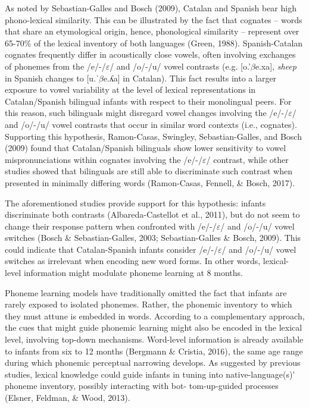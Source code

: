 \documentclass[man,floatsintext]{apa6}
\begin{document}
As noted by Sebastian-Galles and Bosch (2009), Catalan and Spanish bear high phono-lexical similarity. This can be illustrated by the fact that cognates -- words that share an etymological origin, hence, phonological similarity -- represent over 65-70\% of the lexical inventory of both languages (Green, 1988). Spanish-Catalan cognates frequently differ in acoustically close vowels, often involving exchanges of phonemes from the /e/-/\(\varepsilon\)/ and /o/-/u/ vowel contrasts (e.g. {[}o.'\(\beta\)e.xa{]}, \emph{sheep} in Spanish changes to {[}u.ˈ\(\beta\)e.ʎa{]} in Catalan). This fact results into a larger exposure to vowel variability at the level of lexical representations in Catalan/Spanish bilingual infants with respect to their monolingual peers. For this reason, such bilinguals might disregard vowel changes involving the /e/-/\(\varepsilon\)/ and /o/-/u/ vowel contrasts that occur in similar word contexts (i.e., cognates). Supporting this hypothesis, Ramon-Casas, Swingley, Sebastian-Galles, and Bosch (2009) found that Catalan/Spanish bilinguals show lower sensitivity to vowel mispronunciations within cognates involving the /e/-/\(\varepsilon\)/ contrast, while other studies showed that bilinguals are still able to discriminate such contrast when presented in minimally differing words (Ramon-Casas, Fennell, \& Bosch, 2017).

The aforementioned studies provide support for this hypothesis: infants discriminate both contrasts (Albareda-Castellot et al., 2011), but do not seem to change their response pattern when confronted with /e/-/\(\varepsilon\)/ and /o/-/u/ vowel switches (Bosch \& Sebastian-Galles, 2003; Sebastian-Galles \& Bosch, 2009). This could indicate that Catalan-Spanish infants consider /e/-/\(\varepsilon\)/ and /o/-/u/ vowel switches as irrelevant when encoding new word forms. In other words, lexical-level information might modulate phoneme learning at 8 months.

Phoneme learning models have traditionally omitted the fact that infants are rarely exposed to isolated phonemes. Rather, the phonemic inventory to which they must attune is embedded in words. According to a complementary approach, the cues that might guide phonemic learning might also be encoded in the lexical level, involving top-down mechanisms. Word-level information is already available to infants from six to 12 months (Bergmann \& Cristia, 2016), the same age range during which phonemic perceptual narrowing develops. As suggested by previous studies, lexical knowledge could guide infants in tuning into native-language(s)' phoneme inventory, possibly interacting with bot- tom-up-guided processes (Elsner, Feldman, \& Wood, 2013).
\end{document}
